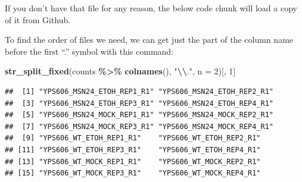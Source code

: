 \documentclass[
]{book}
\newenvironment{Shaded}{\begin{snugshade}}{\end{snugshade}}
\newcommand{\AttributeTok}[1]{\textcolor[rgb]{0.13,0.29,0.53}{#1}}
\newcommand{\DecValTok}[1]{\textcolor[rgb]{0.00,0.00,0.81}{#1}}
\newcommand{\FunctionTok}[1]{\textcolor[rgb]{0.13,0.29,0.53}{\textbf{#1}}}
\newcommand{\NormalTok}[1]{#1}
\newcommand{\SpecialCharTok}[1]{\textcolor[rgb]{0.81,0.36,0.00}{\textbf{#1}}}
\newcommand{\StringTok}[1]{\textcolor[rgb]{0.31,0.60,0.02}{#1}}
\begin{document}
If you don't have that file for any reason, the below code chunk will
load a copy of it from Github.

To find the order of files we need, we can get just the part of the
column name before the first ``.'' symbol with this command:

\begin{Shaded}
\begin{Highlighting}[]
\FunctionTok{str\_split\_fixed}\NormalTok{(counts }\SpecialCharTok{\%\textgreater{}\%} \FunctionTok{colnames}\NormalTok{(), }\StringTok{"}\SpecialCharTok{\textbackslash{}\textbackslash{}}\StringTok{."}\NormalTok{, }\AttributeTok{n =} \DecValTok{2}\NormalTok{)[, }\DecValTok{1}\NormalTok{]}
\end{Highlighting}
\end{Shaded}

\begin{verbatim}
##  [1] "YPS606_MSN24_ETOH_REP1_R1" "YPS606_MSN24_ETOH_REP2_R1"
##  [3] "YPS606_MSN24_ETOH_REP3_R1" "YPS606_MSN24_ETOH_REP4_R1"
##  [5] "YPS606_MSN24_MOCK_REP1_R1" "YPS606_MSN24_MOCK_REP2_R1"
##  [7] "YPS606_MSN24_MOCK_REP3_R1" "YPS606_MSN24_MOCK_REP4_R1"
##  [9] "YPS606_WT_ETOH_REP1_R1"    "YPS606_WT_ETOH_REP2_R1"   
## [11] "YPS606_WT_ETOH_REP3_R1"    "YPS606_WT_ETOH_REP4_R1"   
## [13] "YPS606_WT_MOCK_REP1_R1"    "YPS606_WT_MOCK_REP2_R1"   
## [15] "YPS606_WT_MOCK_REP3_R1"    "YPS606_WT_MOCK_REP4_R1"
\end{verbatim}
\end{document}
